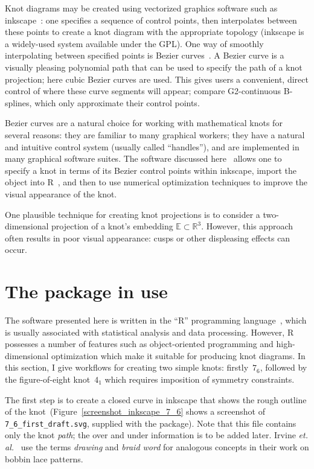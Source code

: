 \documentclass{birkjour}
\theoremstyle{definition}
\theoremstyle{remark}
\numberwithin{equation}{section}
\begin{document}
Knot diagrams may be created using vectorized graphics software such
as inkscape~\cite{Inkscape}: one specifies a sequence of control
points, then interpolates between these points to create a knot
diagram with the appropriate topology (inkscape is a widely-used
system available under the GPL).  One way of smoothly interpolating
between specified points is Bezier curves~\cite{olsen2014}.  A Bezier
curve is a visually pleasing polynomial path that can be used to
specify the path of a knot projection; here cubic Bezier curves are
used.  This gives users a convenient, direct control of where these
curve segments will appear; compare G2-continuous B-splines, which
only approximate their control points.

Bezier curves are a natural choice for working with
mathematical knots for several reasons: they are familiar to many
graphical workers; they have a natural and intuitive control system
(usually called ``handles''), and are implemented in many graphical
software suites.  The software discussed here~\cite{hankin2020} allows
one to specify a knot in terms of its Bezier control points within
inkscape, import the object into R~\cite{rcore2021}, and then to use
numerical optimization techniques to improve the visual appearance of
the knot.

One plausible technique for creating knot projections is to consider a
two-dimensional projection of a knot's embedding
$\mathbb{E}\subset\mathbb{R}^3$.  However, this approach often results in
poor visual appearance: cusps or other displeasing effects can occur.

\section{The package in use}

The software presented here is written in the ``R'' programming
language~\cite{rcore2021}, which is usually associated with
statistical analysis and data processing.  However, R possesses a
number of features such as object-oriented programming and
high-dimensional optimization which make it suitable for producing
knot diagrams.  In this section, I give workflows for creating two
simple knots: firstly~$7_6$, followed by the figure-of-eight
knot~$4_1$ which requires imposition of symmetry constraints.

The first step is to create a closed curve in inkscape that shows the
rough outline of the knot~(Figure~\ref{screenshot_inkscape_7_6} shows
a screenshot of {\tt 7\_6\_first\_draft.svg}, supplied with the
package).  Note that this file contains only the knot {\em path}; the
over and under information is to be added later.  Irvine {\em
  et. al.}~\cite{irvine2020} use the terms {\em drawing} and {\em
  braid word} for analogous concepts in their work on bobbin lace
patterns.
\end{document}
